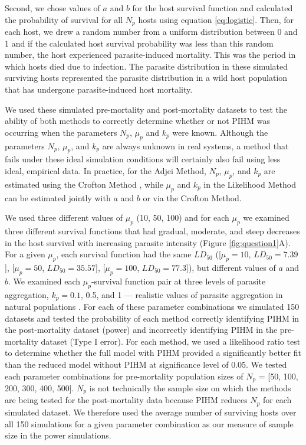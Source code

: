 \documentclass[12pt, a4paper]{article}
\begin{document}
Second, we chose values of $a$ and $b$ for the host survival function and calculated the probability of survival
for all $N_p$ hosts using equation \ref{eq:logistic}.  Then, for each host, we drew a random number from a uniform distribution
between 0 and 1 and if the calculated host survival probability was less than this random
number, the host experienced parasite-induced mortality.  This was the period in which hosts died due to infection. The parasite distribution in these simulated surviving hosts represented the parasite distribution in a wild host population that has undergone parasite-induced host mortality.

We used these simulated pre-mortality and post-mortality datasets to test the
ability of both methods to correctly determine whether or not PIHM was
occurring when the parameters $N_p$, $\mu_p$ and $k_p$ were known.  Although
the parameters $N_p$, $\mu_p$, and $k_p$ are always unknown in real systems, a
method that fails under these ideal simulation conditions will certainly also
fail using less ideal, empirical data. In practice, for the Adjei Method, $N_p$, $\mu_p$,
and $k_p$ are estimated using the Crofton Method \citep{Adjei1986}, while $\mu_p$ and $k_p$ in
the Likelihood Method can be estimated jointly with $a$ and $b$ or via the
Crofton Method.

We used three different values of $\mu_p$ (10, 50, 100) and for each $\mu_p$ we examined three different survival functions that had gradual, moderate, and steep decreases in the host survival with increasing parasite intensity (Figure \ref{fig:question1}A).  For a given $\mu_p$, each survival function had the same $LD_{50}$ ([$\mu_p = 10$, $LD_{50} = 7.39$], [$\mu_p = 50$, $LD_{50} = 35.57$], [$\mu_p = 100$, $LD_{50}= 77.3$]),  but different values of $a$ and $b$.  We examined each $\mu_p$-survival function pair at  three levels of parasite
aggregation, $k_p = 0.1$, 0.5, and 1 --- realistic values of parasite aggregation in natural populations \citep{Shaw1998}.  For each of these parameter
combinations we simulated 150 datasets and tested the probability of each method correctly identifying PIHM in the post-mortality dataset (power) and incorrectly identifying PIHM in the pre-mortality dataset (Type I error).  For each method, we used a likelihood ratio test to determine whether the full model with PIHM provided a significantly better fit than the reduced model without PIHM at significance level of 0.05.  We tested each parameter combinations for pre-mortality population sizes of $N_p$ = [50, 100, 200, 300, 400, 500]. $N_p$ is not technically the sample size on which the methods are being
tested for the post-mortality data because PIHM reduces $N_p$ for each simulated
dataset.  We therefore used the average number of surviving hosts over all 150 simulations for a given parameter combination as our measure of sample size in the power simulations.
\end{document}
